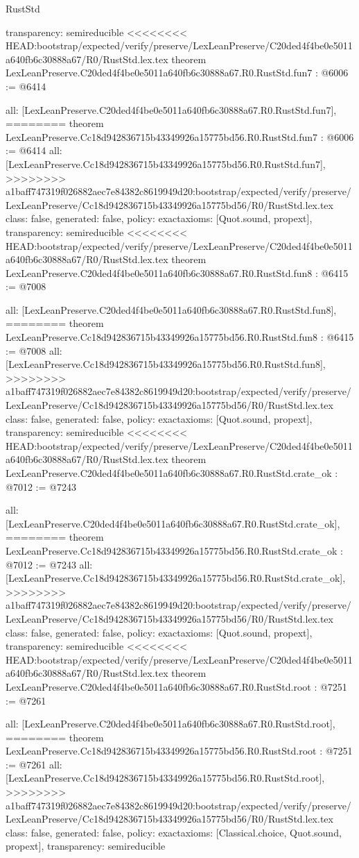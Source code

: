 \begin{lexlean}{RustStd}
\begin{coremodule}
{\begin{coremodule}
{{{{{{{{{{  transparency: semireducible
}
<<<<<<<< HEAD:bootstrap/expected/verify/preserve/LexLeanPreserve/C20ded4f4be0e5011a640fb6c30888a67/R0/RustStd.lex.tex
theorem LexLeanPreserve.C20ded4f4be0e5011a640fb6c30888a67.R0.RustStd.fun7 : @6006 := @6414 {
  all: [LexLeanPreserve.C20ded4f4be0e5011a640fb6c30888a67.R0.RustStd.fun7],
========
theorem LexLeanPreserve.Cc18d942836715b43349926a15775bd56.R0.RustStd.fun7 : @6006 := @6414 {
  all: [LexLeanPreserve.Cc18d942836715b43349926a15775bd56.R0.RustStd.fun7],
>>>>>>>> a1baff747319f026882aec7e84382c8619949d20:bootstrap/expected/verify/preserve/LexLeanPreserve/Cc18d942836715b43349926a15775bd56/R0/RustStd.lex.tex
  class: false,
  generated: false,
  policy: exact{axioms: [Quot.sound, propext]},
  transparency: semireducible
}
<<<<<<<< HEAD:bootstrap/expected/verify/preserve/LexLeanPreserve/C20ded4f4be0e5011a640fb6c30888a67/R0/RustStd.lex.tex
theorem LexLeanPreserve.C20ded4f4be0e5011a640fb6c30888a67.R0.RustStd.fun8 : @6415 := @7008 {
  all: [LexLeanPreserve.C20ded4f4be0e5011a640fb6c30888a67.R0.RustStd.fun8],
========
theorem LexLeanPreserve.Cc18d942836715b43349926a15775bd56.R0.RustStd.fun8 : @6415 := @7008 {
  all: [LexLeanPreserve.Cc18d942836715b43349926a15775bd56.R0.RustStd.fun8],
>>>>>>>> a1baff747319f026882aec7e84382c8619949d20:bootstrap/expected/verify/preserve/LexLeanPreserve/Cc18d942836715b43349926a15775bd56/R0/RustStd.lex.tex
  class: false,
  generated: false,
  policy: exact{axioms: [Quot.sound, propext]},
  transparency: semireducible
}
<<<<<<<< HEAD:bootstrap/expected/verify/preserve/LexLeanPreserve/C20ded4f4be0e5011a640fb6c30888a67/R0/RustStd.lex.tex
theorem LexLeanPreserve.C20ded4f4be0e5011a640fb6c30888a67.R0.RustStd.crate_ok : @7012 := @7243 {
  all: [LexLeanPreserve.C20ded4f4be0e5011a640fb6c30888a67.R0.RustStd.crate_ok],
========
theorem LexLeanPreserve.Cc18d942836715b43349926a15775bd56.R0.RustStd.crate_ok : @7012 := @7243 {
  all: [LexLeanPreserve.Cc18d942836715b43349926a15775bd56.R0.RustStd.crate_ok],
>>>>>>>> a1baff747319f026882aec7e84382c8619949d20:bootstrap/expected/verify/preserve/LexLeanPreserve/Cc18d942836715b43349926a15775bd56/R0/RustStd.lex.tex
  class: false,
  generated: false,
  policy: exact{axioms: [Quot.sound, propext]},
  transparency: semireducible
}
<<<<<<<< HEAD:bootstrap/expected/verify/preserve/LexLeanPreserve/C20ded4f4be0e5011a640fb6c30888a67/R0/RustStd.lex.tex
theorem LexLeanPreserve.C20ded4f4be0e5011a640fb6c30888a67.R0.RustStd.root : @7251 := @7261 {
  all: [LexLeanPreserve.C20ded4f4be0e5011a640fb6c30888a67.R0.RustStd.root],
========
theorem LexLeanPreserve.Cc18d942836715b43349926a15775bd56.R0.RustStd.root : @7251 := @7261 {
  all: [LexLeanPreserve.Cc18d942836715b43349926a15775bd56.R0.RustStd.root],
>>>>>>>> a1baff747319f026882aec7e84382c8619949d20:bootstrap/expected/verify/preserve/LexLeanPreserve/Cc18d942836715b43349926a15775bd56/R0/RustStd.lex.tex
  class: false,
  generated: false,
  policy: exact{axioms: [Classical.choice, Quot.sound, propext]},
  transparency: semireducible
}

}}}}}}}}}}}}}
\end{coremodule}}
\end{coremodule}
\end{lexlean}
